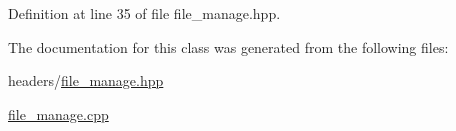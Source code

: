 Definition at line 35 of file file\+\_\+manage.\+hpp.



The documentation for this class was generated from the following files\+:\begin{DoxyCompactItemize}
\item 
headers/\hyperlink{file__manage_8hpp}{file\+\_\+manage.\+hpp}\item 
\hyperlink{file__manage_8cpp}{file\+\_\+manage.\+cpp}\end{DoxyCompactItemize}
